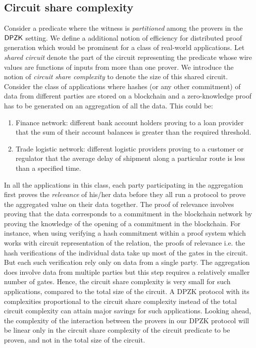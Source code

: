 \subsection{Circuit share complexity}
Consider a predicate where the witness is \textit{partitioned} among the provers in the $\mathsf{DPZK}$ setting. We define a additional notion of efficiency for distributed proof generation which would be prominent for a class of real-world applications.
Let \textit{shared circuit} denote the part of the circuit representing the predicate whose wire values are functions of inputs from more than one prover. 
We introduce the notion of \textit{circuit share complexity} to denote the size of this shared circuit.
Consider the class of applications where hashes (or any other commitment) of data from different parties are stored on a blockchain and a zero-knowledge proof has to be generated on an aggregation of all the data. This could be: 
\begin{enumerate}
\item Finance network: different bank account holders proving to a loan provider that the sum of their account balances is greater than the required threshold.
\item Trade logistic network: different logistic providers proving to a customer or regulator that the average delay of shipment along a particular route is less than a specified time.
\end{enumerate}
In all the applications in this class, each party participating in the aggregation first proves the \textit{relevance} of his/her data before they all run a protocol to prove the aggregated value on their data together. The proof of relevance involves proving that the data corresponds to a commitment in the blockchain network by proving the knowledge of the opening of a commitment in the blockchain. 
For instance, when using verifying a hash commitment within a proof system which works with circuit representation of the relation, the proofs of relevance i.e. the hash verifications of the individual data take up most of the gates in the circuit. But each such verification rely only on data from a single party. The aggregation does involve data from multiple parties but this step requires a relatively smaller number of gates. Hence, the circuit share complexity is very small for such applications, compared to the total size of the circuit. A DPZK protocol with its complexities proportional to the circuit share complexity instead of the total circuit complexity can attain major savings for such applications.%
Looking ahead, the complexity of the interaction between the provers in our DPZK protocol will be linear only in the circuit share complexity of the circuit predicate to be proven, and not in the total size of the circuit. 

